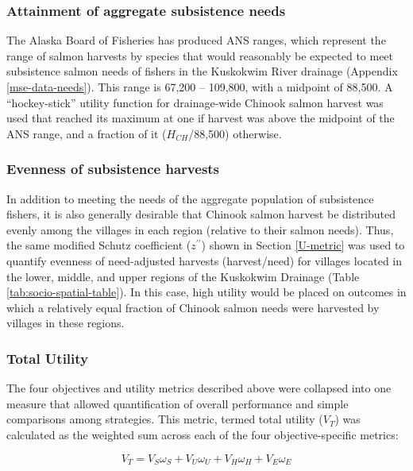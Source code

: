 \documentclass[12pt,]{book}
\theoremstyle{definition}
\theoremstyle{definition}
\theoremstyle{definition}
\theoremstyle{remark}
\begin{document}
\subsubsection{Attainment of aggregate subsistence
needs}\label{attainment-of-aggregate-subsistence-needs}

\noindent
The Alaska Board of Fisheries has produced ANS ranges, which represent
the range of salmon harvests by species that would reasonably be
expected to meet subsistence salmon needs of fishers in the Kuskokwim
River drainage (Appendix \ref{mse-data-needs}). This range is 67,200 --
109,800, with a midpoint of 88,500. A ``hockey-stick'' utility function
for drainage-wide Chinook salmon harvest was used that reached its
maximum at one if harvest was above the midpoint of the ANS range, and a
fraction of it (\(H_{CH}\)/88,500) otherwise.

\subsubsection{Evenness of subsistence
harvests}\label{evenness-of-subsistence-harvests}

\noindent
In addition to meeting the needs of the aggregate population of
subsistence fishers, it is also generally desirable that Chinook salmon
harvest be distributed evenly among the villages in each region
(relative to their salmon needs). Thus, the same modified Schutz
coefficient (\(z^{\prime\prime}\)) shown in Section \ref{U-metric} was
used to quantify evenness of need-adjusted harvests (harvest/need) for
villages located in the lower, middle, and upper regions of the
Kuskokwim Drainage (Table \ref{tab:socio-spatial-table}). In this case,
high utility would be placed on outcomes in which a relatively equal
fraction of Chinook salmon needs were harvested by villages in these
regions.

\subsubsection{Total Utility}\label{total-utility}

\noindent
The four objectives and utility metrics described above were collapsed
into one measure that allowed quantification of overall performance and
simple comparisons among strategies. This metric, termed total utility
(\(V_T\)) was calculated as the weighted sum across each of the four
objective-specific metrics:

\begin{equation}
  V_T = V_S \omega_S + V_U \omega_U + V_H \omega_H + V_E \omega_E
  \label{eq:get-vt}
\end{equation}
\end{document}
